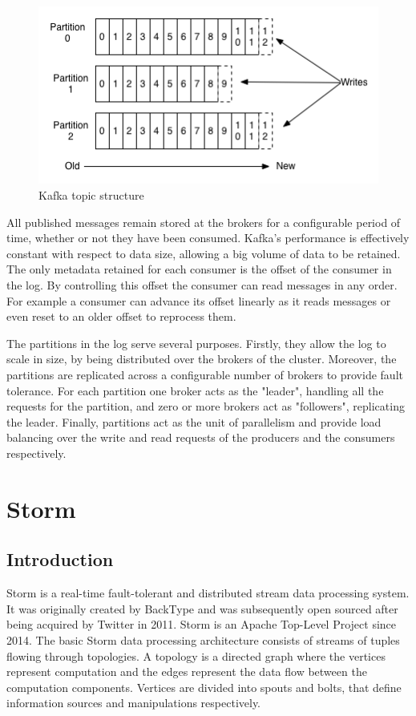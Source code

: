 \begin{figure}[H]
\centering
\includegraphics{figures/kafka_topic}
\caption{Kafka topic structure}
\label{figure:kafka_topic}
\end{figure}

All published messages remain stored at the brokers for a configurable period of time, whether or not they have been consumed. Kafka's performance is effectively constant with respect to data size, allowing a big volume of data to be retained. The only metadata retained for each consumer is the offset of the consumer in the log. By controlling this offset the consumer can read messages in any order. For example a consumer can advance its offset linearly as it reads messages or even reset to an older offset to reprocess them.

The partitions in the log serve several purposes. Firstly, they allow the log to scale in size, by being distributed over the brokers of the cluster. Moreover, the partitions are replicated across a configurable number of brokers to provide fault tolerance. For each partition one broker acts as the "leader",  handling all the requests for the partition, and zero or more brokers act as "followers", replicating the leader. Finally, partitions act as the unit of parallelism and provide load balancing over the write and read requests of the producers and the consumers respectively.

\section{Storm}
\subsection{Introduction}

Storm is a real-time fault-tolerant and distributed stream data processing system. It was originally created by BackType and was subsequently open sourced after being acquired by Twitter in 2011. Storm is an Apache Top-Level Project since 2014. The basic Storm data processing architecture consists of streams of tuples flowing through topologies. A topology is a directed graph where the vertices represent computation and the edges represent the data flow between the computation components. Vertices are divided into spouts and bolts, that define information sources and manipulations respectively.

